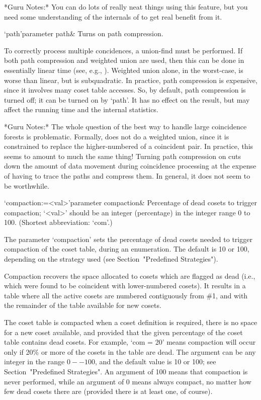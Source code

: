 *Guru Notes:*
You can do lots of really neat things using this feature, but you need
some understanding of the internals of {\ACE} to get real benefit from
it.

\>`path'{parameter path}&
Turns on path compression.

To  correctly  process  multiple  concidences, a  union-find  must  be
performed.  If both path compression and weighted union are used, then
this can be  done in essentially linear time  (see, e.g., \cite{CLR}).
Weighted union alone, in the  worst-case, is worse than linear, but is
subquadratic.  In  practice, path  compression is expensive,  since it
involves many coset table  accesses.  So, by default, path compression
is turned off; it can be turned on by `path'.  It has no effect on the
result, but may affect the running time and the internal statistics.

*Guru Notes:*
The whole question of the best way to handle large coincidence forests
is problematic.  Formally, {\ACE} does  not do a weighted union, since
it is constrained to replace the higher-numbered of a coincident pair.
In practice,  this seems  to amount to  much the same  thing!  Turning
path  compression on  cuts down  the  amount of  data movement  during
coincidence processing at the expense of having to trace the paths and
compress them.  In general, it does not seem to be worthwhile.

\>`compaction:=<val>'{parameter compaction}&
Percentage of dead cosets to trigger compaction;
`<val>' should be an integer (percentage) in the integer range 0 to 100.
(Shortest abbreviation: `com'.)

The parameter `compaction' sets the percentage of dead cosets needed to
trigger compaction of the coset table, during an enumeration.  
The default is 10  or 100, depending on the strategy used
(see Section~"Predefined Strategies").

Compaction recovers the space allocated to cosets which are flagged as
dead  (i.e., which  were found  to be  coincident  with lower-numbered
cosets).   It results  in  a table  where  all the  active cosets  are
numbered contiguously  from \#1, and  with the remainder of  the table
available for new cosets.

The  coset table  is compacted  when a  coset definition  is required,
there is  no space for  a new coset  available, and provided  that the
given  percentage  of  the  coset  table contains  dead  cosets.   For
example, `com =  20' means compaction will occur only  if 20\% or more
of the cosets in the table  are dead.  The argument can be any integer
in  the range  $0--100$,  and the  default  value is  10  or 100;  see
Section~"Predefined  Strategies".   An  argument  of  100  means  that
compaction is  never performed,  while an argument  of 0  means always
compact, no matter how few dead cosets there are (provided there is at
least one, of course).


